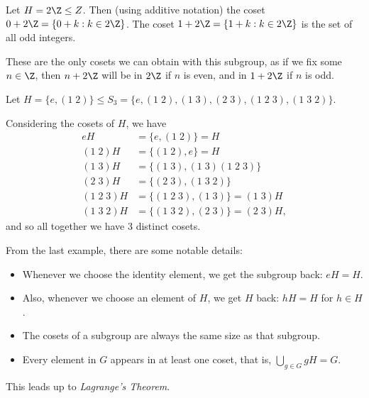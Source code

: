 \documentclass[a4]{scrreprt}
\begin{document}
\begin{example}[Cosets of $2\Z$]
Let $H = 2\Z \leq Z$. Then (using additive notation) the coset $0 + 2\Z = \{0 + k : k \in 2\Z\}$. The coset $1 + 2\Z = \{1 + k : k \in 2\Z\}$ is the set of all odd integers.  

These are the only cosets we can obtain with this subgroup, as if we fix some $n \in \Z$, then $n + 2\Z$ will be in $2\Z$ if $n$ is even, and in $1 + 2\Z$ if $n$ is odd.
\end{example}

\begin{example}
	Let $H = \{ e, (1\; 2) \} \leq S_3 = \{e, (1\; 2), (1\; 3), (2\; 3), (1\; 2\; 3), (1\; 3\; 2)\}$.

	Considering the cosets of $H$, we have 
	\begin{align*}
		eH &= \{ e, (1\; 2) \} = H \\
		(1\; 2) H &= \{(1\; 2), e\} = H \\
		(1\; 3) H &= \{ (1\; 3), (1\; 3)(1\; 2\; 3)\} \\
		(2\; 3) H &= \{(2\; 3), (1\; 3\; 2)\}\\
		(1\; 2\; 3) H &= \{ (1\; 2\; 3), (1\; 3)\} = (1\; 3)H\\
		(1\; 3\; 2) H &= \{(1\; 3\; 2), (2\; 3)\} = (2\; 3)H,
	\end{align*}
	and so all together we have 3 distinct cosets.
\end{example}

From the last example, there are some notable details:
\begin{itemize}
	\item Whenever we choose the identity element, we get the subgroup back: $eH = H$.
	\item Also, whenever we choose an element of $H$, we get $H$ back: $h H= H$ for $h \in H$.
	\item The cosets of a subgroup are always the same size as that subgroup.
	\item Every element in $G$ appears in at least one coset, that is, $\displaystyle \bigcup_{g \in G} gH = G$.
\end{itemize}

This leads up to \emph{Lagrange's Theorem}.
\end{document}
